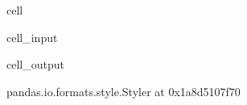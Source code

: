 \documentclass[letterpaper,10pt,english]{jupyterBook}
\begin{document}
\begin{sphinxuseclass}{cell}\begin{sphinxVerbatimInput}

\begin{sphinxuseclass}{cell_input}
\begin{sphinxVerbatim}[commandchars=\\\{\}]
  
\end{sphinxVerbatim}

\end{sphinxuseclass}\end{sphinxVerbatimInput}
\begin{sphinxVerbatimOutput}

\begin{sphinxuseclass}{cell_output}
\begin{sphinxVerbatim}[commandchars=\\\{\}]
\PYGZlt{}pandas.io.formats.style.Styler at 0x1a8d5107f70\PYGZgt{}
\end{sphinxVerbatim}

\end{sphinxuseclass}\end{sphinxVerbatimOutput}

\end{sphinxuseclass}
\end{document}
